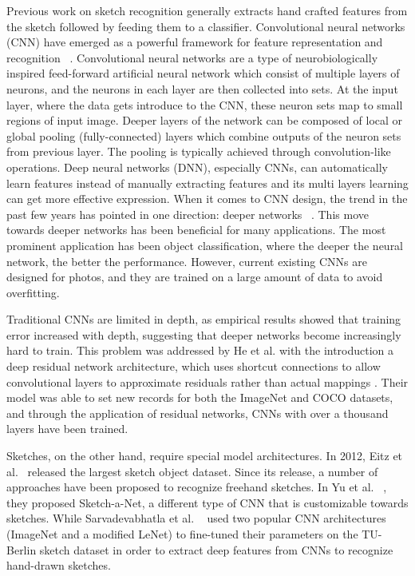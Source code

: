 \documentclass[10pt,twocolumn,letterpaper]{article}
\begin{document}
Previous work on sketch recognition generally extracts hand crafted features from the sketch followed by feeding them to a classifier.  Convolutional neural networks (CNN) have emerged as a powerful framework for feature representation and recognition ~\cite{krizhevsky2012imagenet}.  Convolutional neural networks are a type of neurobiologically inspired feed-forward artificial neural network which consist of multiple layers of neurons,  and  the neurons in each layer are then collected into sets. At the input layer, where the data gets introduce to the CNN, these neuron sets map to small regions of input image. Deeper layers of the network can be composed of local or global pooling (fully-connected) layers which combine outputs of the neuron sets from previous layer. The pooling is typically achieved through convolution-like operations. Deep neural networks (DNN), especially CNNs, can automatically learn features instead of manually extracting features and its multi layers learning can get more effective expression. When it comes to CNN design, the trend in the past few years has pointed in one direction: deeper networks ~\cite{krizhevsky2012imagenet}. This move towards deeper networks  has been beneficial for many applications. The most prominent application has been object classification, where the deeper the neural network, the better the performance. However, current existing CNNs are designed for photos, and they are trained on a large amount of data to avoid overfitting. 

Traditional CNNs are limited in depth, as empirical results showed that training error increased with depth, suggesting that deeper networks become increasingly hard to train. This problem was addressed by He et al. with the introduction a deep residual network architecture, which uses shortcut connections to allow convolutional layers to approximate residuals rather than actual mappings \cite{hekaming2016}. Their model was able to set new records for both the ImageNet and COCO datasets, and through the application of residual networks, CNNs with over a thousand layers have been trained.

Sketches, on the other hand, require special model architectures. In 2012, Eitz et al.~\cite{eitz2012hdhso} released the largest sketch object dataset. Since its release, a number of approaches have been proposed to recognize freehand sketches.  In Yu et al. ~\cite{yu2016sketch}, they proposed Sketch-a-Net, a different type of CNN that is customizable towards sketches. While Sarvadevabhatla et al. ~\cite{sarvadevabhatla2015freehand} used two popular CNN architectures (ImageNet and a modified LeNet) to fine-tuned their parameters on the TU-Berlin sketch dataset in order to extract deep features from CNNs to recognize hand-drawn sketches. 
\end{document}
